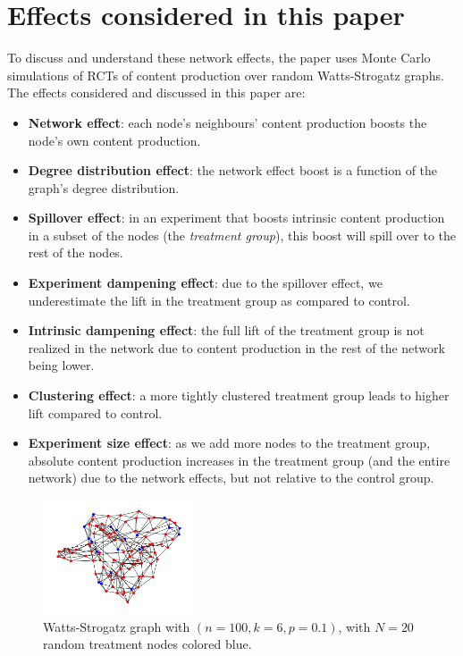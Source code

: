 \documentclass[final,5p,times,twocolumn,authoryear]{elsarticle}
\begin{document}
\section{Effects considered in this paper}

To discuss and understand these network effects, the paper uses Monte Carlo simulations of RCTs of content production over random Watts-Strogatz graphs. The effects considered and discussed in this paper are:

\begin{itemize}
\setlength\itemsep{0em}
    \item \textbf{Network effect}: each node's neighbours' content production boosts the node's own content production.
    \item \textbf{Degree distribution effect}: the network effect boost is a function of the graph's degree distribution.
    \item \textbf{Spillover effect}: in an experiment that boosts intrinsic content production in a subset of the nodes (the \textit{treatment group}), this boost will spill over to the rest of the nodes.
    \item \textbf{Experiment dampening effect}: due to the spillover effect, we underestimate the lift in the treatment group as compared to control.
    \item \textbf{Intrinsic dampening effect}: the full lift of the treatment group is not realized in the network due to content production in the rest of the network being lower.
    \item \textbf{Clustering effect}: a more tightly clustered treatment group leads to higher lift compared to control.
    \item \textbf{Experiment size effect}: as we add more nodes to the treatment group, absolute content production increases in the treatment group (and the entire network) due to the network effects, but not relative to the control group.
\end{itemize}

\begin{figure}[h]
	\centering 
	\includegraphics[width=0.4\textwidth]{figure-1.png}	
	\caption{Watts-Strogatz graph with $(n=100, k=6, p=0.1)$, with $N=20$ random treatment nodes colored blue.} 
\end{figure}
\end{document}
